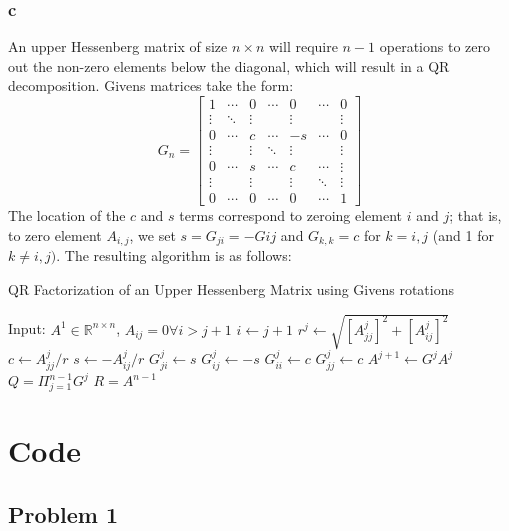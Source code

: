 \documentclass[11pt]{report}
\theoremstyle{definition}
\begin{document}
\subsubsection*{c}
An upper Hessenberg matrix of size $n\times n$ will require $n-1$ operations to zero out the
non-zero elements below the diagonal, which will result in a QR decomposition.
Givens matrices take the form:
\[
	G_n = \begin{bmatrix}
		1      & \cdots & 0      & \cdots & 0      & \cdots & 0      \\
		\vdots & \ddots & \vdots &        & \vdots &        & \vdots \\
		0      & \cdots & c      & \cdots & -s     & \cdots & 0      \\
		\vdots &        & \vdots & \ddots & \vdots &        & \vdots \\
		0      & \cdots & s      & \cdots & c      & \cdots & \vdots \\
		\vdots &        & \vdots &        & \vdots & \ddots & \vdots \\
		0      & \cdots & 0      & \cdots & 0      & \cdots & 1
	\end{bmatrix}
\]
The location of the $c$ and $s$ terms correspond to zeroing element $i$ and $j$;
that is, to zero element $A_{i,j}$, we set $s=G_{ji}=-G{ij}$ and $G_{k,k}=c$ for
$k=i,j$ (and 1 for $k\neq i,j)$. The resulting algorithm is as follows:
\begin{algorithm}
	\caption{QR Factorization of an Upper Hessenberg Matrix using Givens rotations}
	\begin{algorithmic}
		\STATE Input: $A^1\in\mathbb{R}^{n\times n}$, $A_{ij}=0\forall i>j+1$
		\STATE $i\gets j+1$
		\STATE $r^{j}\gets \sqrt{\left[{A}^{j}_{jj}\right]^2+\left[A^{j}_{ij}\right]^2}$
		\STATE $c\gets A^j_{jj}/r$
		\STATE $s \gets -A^j_{ij}/r$
		\STATE $G^{j}_{ji} \gets s$
		\STATE $G^{j}_{ij}\gets -s$
		\STATE $G^{j}_{ii}\gets c$
		\STATE $G^{j}_{jj}\gets c$
		\STATE $A^{j+1} \gets G^{j}A^j$
		\ENDFOR
		\STATE $Q = \Pi_{j=1}^{n-1} G^{j}$
		\STATE $R = A^{n-1}$
	\end{algorithmic}
\end{algorithm}


\newpage
\section*{Code}
\lstset{style=mystyle}


\subsection*{Problem 1}

\end{document}
